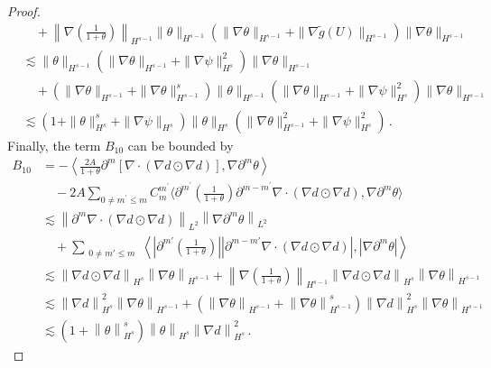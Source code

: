 \documentclass[reqno,11pt]{amsart}
\numberwithin{equation}{section}
\def\p{\partial}
\def\no{\nonumber}
\begin{document}
\begin{proof}
\begin{align}
& \quad+ \left\| \nabla \left( \frac{1}{1+\theta} \right) \right\|_{H^{s-1}} \|\theta\|_{H^{s-1}} \left( \|\nabla \theta\|_{H^{s-1}} + \|\nabla \tilde{g}(U)\|_{H^{s-1}} \right) \|\nabla \theta\|_{H^{s-1}}\\
\no & \lesssim\|\theta\|_{H^{s-1}} \left( \|\nabla \theta\|_{H^{s-1}} + \|\nabla \psi\|_{H^s}^2 \right) \|\nabla \theta\|_{H^{s-1}} \\
\no & \quad+ \left( \|\nabla \theta\|_{H^{s-1}} + \|\nabla \theta\|_{H^{s-1}}^s \right) \|\theta\|_{H^{s-1}} \left( \|\nabla \theta\|_{H^{s-1}} + \|\nabla \psi\|_{H^s}^2 \right) \|\nabla \theta\|_{H^{s-1}}\\
\no & \lesssim \left( 1 + \|\theta\|_{H^s}^s + \|\nabla \psi\|_{H^s} \right) \|\theta\|_{H^s} \left( \|\nabla \theta\|_{H^{s-1}}^2 + \|\nabla \psi\|_{H^s}^2 \right) \,.
\end{align}
Finally, the term $B_{10}$ can be bounded by
\begin{equation}\label{theta-eq11}
\begin{aligned}
B_{10} & = - \left\langle \frac{2A}{1+\theta}\partial^m \left[  \nabla \cdot (\nabla d \odot \nabla d) \right], \nabla \partial^m \theta \right\rangle\\&
\quad -2A\sum_{0\neq m^\prime\leq m}C^{m^\prime}_m\langle \p^{m^\prime}(\frac{1}{1+\theta})\p^{m-m^\prime}\nabla\cdot(\nabla d\odot\nabla d),\nabla\p^m \theta  \rangle\\&
\lesssim \left\| \partial^m \nabla \cdot (\nabla d \odot \nabla d) \right\|_{L^2} \left\| \nabla \partial^m \theta \right\|_{L^2}\\&\quad
+ \sum_{\substack{0 \neq m' \leq m}} \left\langle| \partial^{m'} \left( \frac{1}{1+\theta} \right) ||\partial^{m - m'} \nabla \cdot (\nabla d \odot \nabla d)|, |\nabla \partial^m \theta| \right\rangle\\&
\lesssim \left\| \nabla d \odot \nabla d \right\|_{H^s} \left\| \nabla \theta \right\|_{H^{s-1}}
+ \left\| \nabla \left( \frac{1}{1+\theta} \right) \right\|_{H^{s-1}} \left\| \nabla d \odot \nabla d \right\|_{H^s} \left\| \nabla \theta \right\|_{H^{s-1}}\\&
\lesssim \left\| \nabla d \right\|_{H^s}^2 \left\| \nabla \theta \right\|_{H^{s-1}} + \left( \left\| \nabla \theta \right\|_{H^{s-1}} + \left\| \nabla \theta \right\|_{H^{s-1}}^s \right) \left\| \nabla d \right\|_{H^s}^2 \left\| \nabla \theta \right\|_{H^{s-1}} \\&
\lesssim \left( 1 + \left\| \theta \right\|_{H^s}^s \right) \left\| \theta \right\|_{H^s} \left\| \nabla d \right\|_{H^s}^2 \,.

\end{aligned}
\end{equation}
\end{proof}
\end{document}
